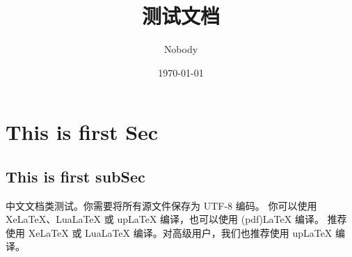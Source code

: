 \documentclass[UTF8, 11pt, a4paper,oneside]{ctexart}
\begin{document}
\title{测试文档}
\date{ \today }
\author{Nobody}
\maketitle
\tableofcontents


\section{This is first Sec}
\subsection{ This is first subSec}
中文文档类测试。你需要将所有源文件保存为 UTF-8 编码。
你可以使用 XeLaTeX、LuaLaTeX 或 upLaTeX 编译，也可以使用 (pdf)LaTeX 编译。
推荐使用 XeLaTeX 或 LuaLaTeX 编译。对高级用户，我们也推荐使用 upLaTeX 编译。
\end{document}
